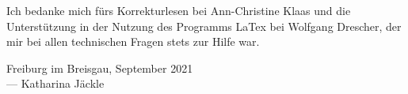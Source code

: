 Ich bedanke mich fürs Korrekturlesen bei Ann-Christine Klaas und die
Unterstützung in der Nutzung des Programms LaTex bei Wolfgang Drescher, der mir
bei allen technischen Fragen stets zur Hilfe war. 




\vspace{0.5cm}

\begin{flushright}
	{
		\small
		Freiburg im Breisgau, September 2021\\
		--- Katharina Jäckle
	}
\end{flushright}
